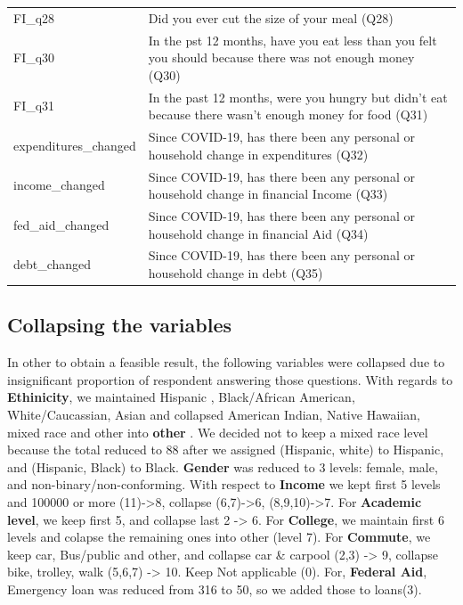 \documentclass[
  10pt,
]{article}
\begin{document}
\begin{table}[H]
{\begin{tabular}[t]{ll}
FI\_q28 & Did you ever cut the size of your meal (Q28)\\
FI\_q30 & In the pst 12 months, have you eat less than you felt you should because there was not enough money (Q30)\\
FI\_q31 & In the past 12 months, were you hungry but didn't eat because there wasn't enough money for food (Q31)\\
expenditures\_changed & Since COVID-19, has there been any personal or household change in expenditures (Q32)\\
income\_changed & Since COVID-19, has there been any personal or household change in financial Income (Q33)\\
fed\_aid\_changed & Since COVID-19, has there been any personal or household change in financial Aid (Q34)\\
debt\_changed & Since COVID-19, has there been any personal or household change in debt (Q35)\\
\bottomrule
\end{tabular}}
\end{table}

\subsection{Collapsing the variables}

In other to obtain a feasible result, the following variables were collapsed due to insignificant proportion of respondent answering those questions. With regards to \textbf{Ethinicity}, we maintained Hispanic , Black/African American, White/Caucassian, Asian and collapsed American Indian, Native Hawaiian, mixed race and other into \textbf{other} . We decided not to keep a mixed race level because the total reduced to 88 after we assigned (Hispanic, white) to Hispanic, and (Hispanic, Black) to Black. \textbf{Gender} was reduced to 3 levels: female, male, and non-binary/non-conforming. With respect to \textbf{Income} we kept first 5 levels and 100000 or more (11)-\textgreater8, collapse (6,7)-\textgreater6, (8,9,10)-\textgreater7. For \textbf{Academic level}, we keep first 5, and collapse last 2 -\textgreater{} 6. For \textbf{College}, we maintain first 6 levels and colapse the remaining ones into other (level 7). For \textbf{Commute}, we keep car, Bus/public and other, and collapse car \& carpool (2,3) -\textgreater{} 9, collapse bike, trolley, walk (5,6,7) -\textgreater{} 10. Keep Not applicable (0). For, \textbf{Federal Aid}, Emergency loan was reduced from 316 to 50, so we added those to loans(3).
\end{document}
